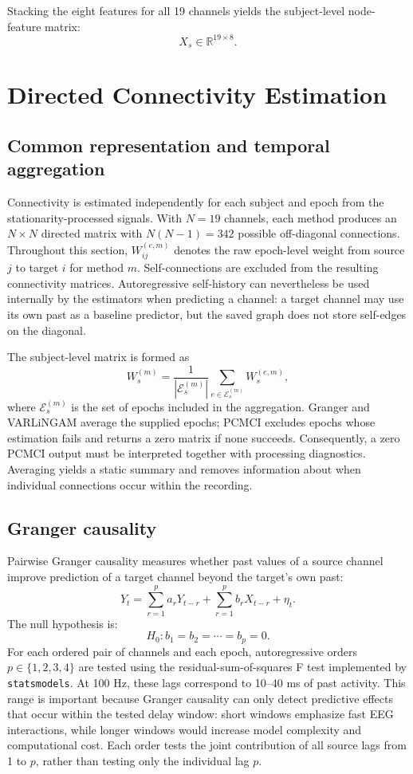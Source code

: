 \documentclass[11pt,a4paper]{article}
\newcommand{\R}{\mathbb{R}}
\begin{document}
Stacking the eight features for all 19 channels yields the subject-level
node-feature matrix:
\[
    X_s\in\R^{19\times8}.
\]

\section{Directed Connectivity Estimation}

\subsection{Common representation and temporal aggregation}

Connectivity is estimated independently for each subject and epoch from the
stationarity-processed signals. With $N=19$ channels, each method produces
an $N\times N$ directed matrix with $N(N-1)=342$ possible off-diagonal
connections. Throughout this section, $W^{(e,m)}_{ij}$ denotes the raw
epoch-level weight from source $j$ to target $i$ for method $m$.
Self-connections are excluded from the resulting connectivity matrices.
Autoregressive self-history can nevertheless be used internally by the
estimators when predicting a channel: a target channel may use its own past
as a baseline predictor, but the saved graph does not store self-edges on the
diagonal.

The subject-level matrix is formed as
\[
    W_s^{(m)}=\frac{1}{|\mathcal E_s^{(m)}|}
    \sum_{e\in\mathcal E_s^{(m)}} W_s^{(e,m)},
\]
where $\mathcal E_s^{(m)}$ is the set of epochs included in the aggregation.
Granger and VARLiNGAM average the supplied epochs; PCMCI excludes epochs
whose estimation fails and returns a zero matrix if none succeeds.
Consequently, a zero PCMCI output must be interpreted together with processing
diagnostics. Averaging yields a static summary and removes information about
when individual connections occur within the recording.

\subsection{Granger causality}

Pairwise Granger causality measures whether past values of a source channel
improve prediction of a target channel beyond the target's own past:
\[
    Y_t =
    \sum_{r=1}^{p}a_rY_{t-r}
    +
    \sum_{r=1}^{p}b_rX_{t-r}
    +\eta_t.
\]
The null hypothesis is:
\[
    H_0:b_1=b_2=\cdots=b_p=0.
\]
For each ordered pair of channels and each epoch, autoregressive orders
$p\in\{1,2,3,4\}$ are tested using the residual-sum-of-squares F test
implemented by \texttt{statsmodels}. At 100 Hz, these lags correspond to
10--40 ms of past activity. This range is important because Granger causality
can only detect predictive effects that occur within the tested delay window:
short windows emphasize fast EEG interactions, while longer windows would
increase model complexity and computational cost. Each order tests the joint
contribution of all source lags from 1 to $p$, rather than testing only the
individual lag $p$.
\end{document}
